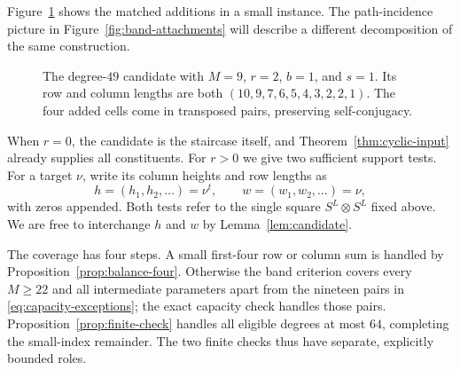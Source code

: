 Figure~\ref{fig:candidate} shows the matched additions in a small instance.
The path-incidence picture in Figure~\ref{fig:band-attachments} will
describe a different decomposition of the same construction.

\begin{figure}[ht]
\centering
{}
\caption{The degree-$49$ candidate with $M=9$, $r=2$, $b=1$, and
$s=1$. Its row and column lengths are both
$(10,9,7,6,5,4,3,2,2,1)$. The four added cells come in transposed
pairs, preserving self-conjugacy.}
\label{fig:candidate}
\end{figure}

When $r=0$, the candidate is the staircase itself, and
Theorem~\ref{thm:cyclic-input} already supplies all constituents.
For $r>0$ we give two sufficient support tests. For a target $\nu$,
write its column heights and row lengths as
\[
 h=(h_1,h_2,\ldots)=\nu^t,\qquad
 w=(w_1,w_2,\ldots)=\nu,
\]
with zeros appended. Both tests refer to the single square
$S^L\otimes S^L$ fixed above. We are free to interchange $h$ and $w$
by Lemma~\ref{lem:candidate}.

The coverage has four steps. A small first-four row or column sum is
handled by Proposition~\ref{prop:balance-four}. Otherwise the band
criterion covers every $M\ge22$ and all intermediate parameters apart
from the nineteen pairs in \eqref{eq:capacity-exceptions}; the exact
capacity check handles those pairs. Proposition~\ref{prop:finite-check}
handles all eligible degrees at most $64$, completing the small-index
remainder. The two finite checks thus have separate, explicitly bounded
roles.
